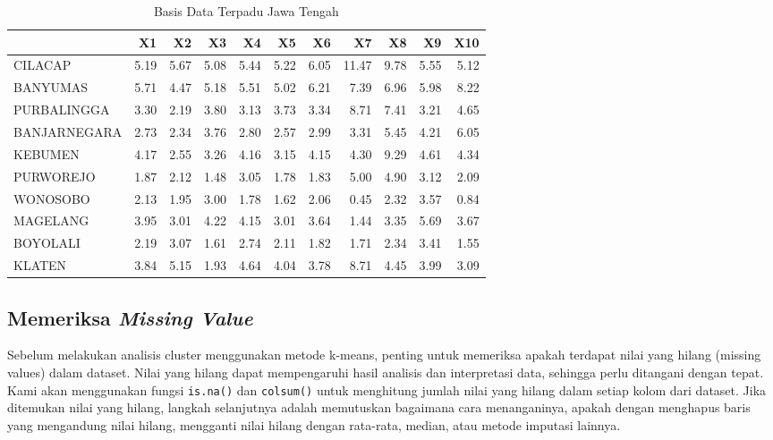 \documentclass[
  oneside]{book}
\begin{document}
\begin{table}

\caption{\label{tab:nice-tab-km}Basis Data Terpadu Jawa Tengah}
\centering
\begin{tabular}[t]{lrrrrrrrrrr}
\toprule
  & X1 & X2 & X3 & X4 & X5 & X6 & X7 & X8 & X9 & X10\\
\midrule
CILACAP & 5.19 & 5.67 & 5.08 & 5.44 & 5.22 & 6.05 & 11.47 & 9.78 & 5.55 & 5.12\\
BANYUMAS & 5.71 & 4.47 & 5.18 & 5.51 & 5.02 & 6.21 & 7.39 & 6.96 & 5.98 & 8.22\\
PURBALINGGA & 3.30 & 2.19 & 3.80 & 3.13 & 3.73 & 3.34 & 8.71 & 7.41 & 3.21 & 4.65\\
BANJARNEGARA & 2.73 & 2.34 & 3.76 & 2.80 & 2.57 & 2.99 & 3.31 & 5.45 & 4.21 & 6.05\\
KEBUMEN & 4.17 & 2.55 & 3.26 & 4.16 & 3.15 & 4.15 & 4.30 & 9.29 & 4.61 & 4.34\\
\addlinespace
PURWOREJO & 1.87 & 2.12 & 1.48 & 3.05 & 1.78 & 1.83 & 5.00 & 4.90 & 3.12 & 2.09\\
WONOSOBO & 2.13 & 1.95 & 3.00 & 1.78 & 1.62 & 2.06 & 0.45 & 2.32 & 3.57 & 0.84\\
MAGELANG & 3.95 & 3.01 & 4.22 & 4.15 & 3.01 & 3.64 & 1.44 & 3.35 & 5.69 & 3.67\\
BOYOLALI & 2.19 & 3.07 & 1.61 & 2.74 & 2.11 & 1.82 & 1.71 & 2.34 & 3.41 & 1.55\\
KLATEN & 3.84 & 5.15 & 1.93 & 4.64 & 4.04 & 3.78 & 8.71 & 4.45 & 3.99 & 3.09\\
\bottomrule
\end{tabular}
\end{table}

\subsection*{\texorpdfstring{Memeriksa \emph{Missing Value}}{Memeriksa Missing Value}}\label{memeriksa-missing-value}

Sebelum melakukan analisis cluster menggunakan metode k-means, penting untuk memeriksa apakah terdapat nilai yang hilang (missing values) dalam dataset. Nilai yang hilang dapat mempengaruhi hasil analisis dan interpretasi data, sehingga perlu ditangani dengan tepat. Kami akan menggunakan fungsi \texttt{is.na()} dan \texttt{colsum()} untuk menghitung jumlah nilai yang hilang dalam setiap kolom dari dataset. Jika ditemukan nilai yang hilang, langkah selanjutnya adalah memutuskan bagaimana cara menanganinya, apakah dengan menghapus baris yang mengandung nilai hilang, mengganti nilai hilang dengan rata-rata, median, atau metode imputasi lainnya.
\end{document}

